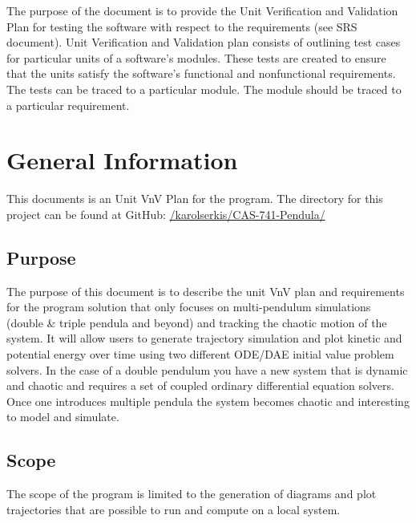 \documentclass[12pt, titlepage]{article}
\begin{document}
\newpage

\tableofcontents

\listoftables


\newpage


The purpose of the document is to provide the Unit Verification and Validation Plan for testing the \progname{}software with 
respect to the requirements (see SRS document). Unit Verification and 
Validation plan consists of outlining test cases for particular units of a 
software's modules. These tests are created to ensure that the units satisfy 
the software's functional and nonfunctional requirements. The tests can be 
traced to a particular module. The module should be traced to a particular 
requirement. 

\section{General Information}

This documents is an Unit VnV Plan for the \progname program. The
directory for this project can be found at GitHub:
\href{https://github.com/karolserkis/CAS-741-Pendula/}{/karolserkis/CAS-741-Pendula/}\\

\subsection{Purpose}

The purpose of this document is to describe the unit VnV plan and requirements for the
\progname program solution that
only focuses on multi-pendulum simulations (double \& triple pendula and beyond) and tracking the chaotic
motion of the system. It will allow users to generate trajectory simulation and
plot kinetic and potential energy over time using two different ODE/DAE initial value
problem solvers. In the case of a double pendulum you have a new system that is dynamic and chaotic and
requires a set of coupled ordinary differential equation solvers. Once one
introduces multiple pendula the system becomes chaotic and interesting 
to model and simulate. 

\subsection{Scope}

The scope of the \progname program is limited to the generation 
of diagrams and plot trajectories that are possible to run and compute on a
local system.
\end{document}
